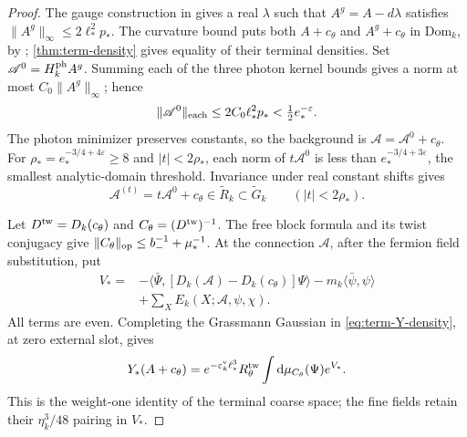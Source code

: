 \begin{proof}
The gauge construction in
\cite[(32)--(33)]{MaxwellBlock}
gives a real $\lambda$ such that
$A^g=A-d\lambda$ satisfies $\|A^g\|_\infty\le2\ell_*^2p_*$.
The curvature bound puts both $A+c_\theta$ and
$A^g+c_\theta$ in $\mathrm{Dom}_k$, by
\cite[Theorem~B]{MaxwellBlock};
\cref{thm:term-density} gives equality of their
terminal densities.
Set $\mathscr A^0=H_k^{\rm ph}A^g$.
Summing each of the three photon kernel bounds gives
a norm at most $C_0\|A^g\|_\infty$; hence
\[
 \|\mathscr A^0\|_{\rm each}
                    \le2C_0\ell_*^2p_*<\tfrac12e_*^{-\varepsilon}.
\]
The photon minimizer preserves constants, so the
background is $\mathscr A=\mathscr A^0+c_\theta$.
For $\rho_*=e_*^{-3/4+4\varepsilon}\ge8$ and
$|t|<2\rho_*$, each norm of $t\mathscr A^0$ is
less than $e_*^{-3/4+3\varepsilon}$, the smallest
analytic-domain threshold. Invariance under real
constant shifts gives
\begin{equation}\label{eq:term-terminal-disc}
 \mathscr A^{(t)}=t\mathscr A^0+c_\theta
                  \in\widetilde R_k\subset\widetilde G_k
                         \qquad(|t|<2\rho_*).
\end{equation}

Let $D^{\rm tw}=D_k(c_\theta)$ and
$C_\theta=(D^{\rm tw})^{-1}$.
The free block formula and its twist conjugacy give
$\|C_\theta\|_{\rm op}\le b_-^{-1}+\mu_*^{-1}$.
At the connection $\mathscr A$, after the fermion
field substitution, put
\begin{align}
 V_*={}&-\langle\bar\Psi,
          [D_k(\mathscr A)-D_k(c_\theta)]\Psi\rangle
               -m_k\langle\bar\psi,\psi\rangle\nonumber\\
       &+\sum_XE_k(X;\mathscr A,\psi,\chi).
                                      \label{eq:term-terminal-interaction}
\end{align}
All terms are even. Completing the Grassmann Gaussian
in \eqref{eq:term-Y-density}, at zero external slot, gives
\begin{equation}\label{eq:term-terminal-Gaussian}
 Y_*(A+c_\theta)=e^{-\varepsilon_k^{\rm v}\ell_*^3}
             R_\theta^{\rm tw}\int\mathrm d\mu_{C_\theta}(\Psi)e^{V_*}.
\end{equation}
This is the weight-one identity of the terminal coarse
space; the fine fields retain their $\eta_k^3/48$
pairing in $V_*$.


\end{proof}
